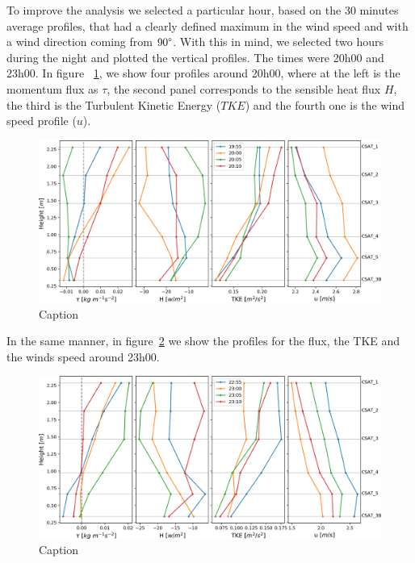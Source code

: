 To improve the analysis we selected a particular hour, based on the 30 minutes average profiles, that had a clearly defined maximum in the wind speed and with a wind direction coming from $90\degree$. With this in mind, we selected two hours during the night and plotted the vertical profiles. The times were 20h00 and 23h00. In figure ~\ref{fig:vert_prof_a}, we show four profiles around 20h00, where at the left is the momentum flux as $\tau$, the second panel corresponds to the sensible heat flux $H$, the third is the Turbulent Kinetic Energy ($TKE$) and the fourth one is the wind speed profile ($u$). 

\begin{figure}
    \centering
    \includegraphics[width=1\textwidth]{fig/chapter_4/23-24/vert_prof_a_speedmax.png}
    \caption{Caption}
    \label{fig:vert_prof_a}
\end{figure}

In the same manner, in figure~\ref{fig:vert_prof_b} we show the profiles for the flux, the TKE and the winds speed around 23h00. 

\begin{figure}
    \centering
    \includegraphics[width=1\textwidth]{fig/chapter_4/23-24/vert_prof_b_speedmax.png}
    \caption{Caption}
    \label{fig:vert_prof_b}
\end{figure}